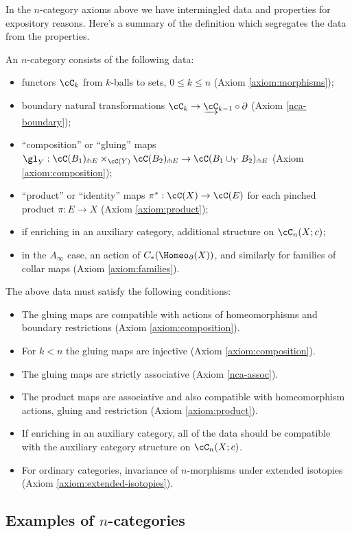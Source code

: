 In the $n$-category axioms above we have intermingled data and properties for expository reasons.
Here's a summary of the definition which segregates the data from the properties.

An $n$-category consists of the following data: 
\begin{itemize}
\item functors $\cC_k$ from $k$-balls to sets, $0\le k\le n$ (Axiom \ref{axiom:morphisms});
\item boundary natural transformations $\cC_k \to \cl{\cC}_{k-1} \circ \bd$ (Axiom \ref{nca-boundary});
\item ``composition'' or ``gluing'' maps $\gl_Y : \cC(B_1)\trans E \times_{\cC(Y)} \cC(B_2)\trans E \to \cC(B_1\cup_Y B_2)\trans E$ (Axiom \ref{axiom:composition});
\item ``product'' or ``identity'' maps $\pi^*:\cC(X)\to \cC(E)$ for each pinched product $\pi:E\to X$ (Axiom \ref{axiom:product});
\item if enriching in an auxiliary category, additional structure on $\cC_n(X; c)$;
\item in the $A_\infty$ case, an action of $C_*(\Homeo_\bd(X))$, and similarly for families of collar maps (Axiom \ref{axiom:families}).
\end{itemize}
The above data must satisfy the following conditions:
\begin{itemize}
\item The gluing maps are compatible with actions of homeomorphisms and boundary 
restrictions (Axiom \ref{axiom:composition}).
\item For $k<n$ the gluing maps are injective (Axiom \ref{axiom:composition}).
\item The gluing maps are strictly associative (Axiom \ref{nca-assoc}).
\item The product maps are associative and also compatible with homeomorphism actions, gluing and restriction (Axiom \ref{axiom:product}).
\item If enriching in an auxiliary category, all of the data should be compatible 
with the auxiliary category structure on $\cC_n(X; c)$.
\item For ordinary categories, invariance of $n$-morphisms under extended isotopies (Axiom \ref{axiom:extended-isotopies}).
\end{itemize}


\subsection{Examples of \texorpdfstring{$n$}{n}-categories}
\label{ss:ncat-examples}


